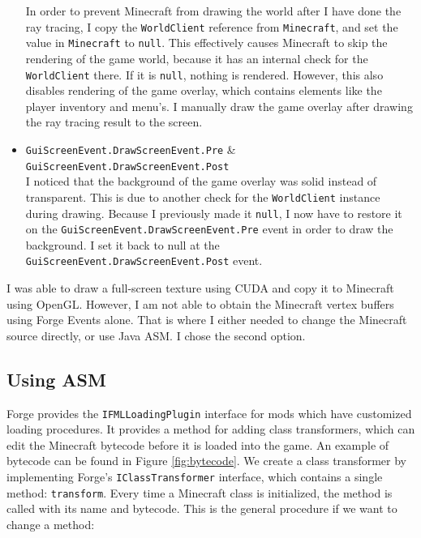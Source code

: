 \documentclass[]{article}
\begin{document}
\begin{itemize}
    In order to prevent Minecraft from drawing the world after I have done the ray tracing, I copy the \texttt{WorldClient} reference from \texttt{Minecraft}, and set the value in \texttt{Minecraft} to \texttt{null}.
    This effectively causes Minecraft to skip the rendering of the game world, because it has an internal check for the \texttt{WorldClient} there.
    If it is \texttt{null}, nothing is rendered.
    However, this also disables rendering of the game overlay, which contains elements like the player inventory and menu's.
    I manually draw the game overlay after drawing the ray tracing result to the screen.
  \item \texttt{GuiScreenEvent.DrawScreenEvent.Pre} \& \texttt{GuiScreenEvent.DrawScreenEvent.Post} \\
    I noticed that the background of the game overlay was solid instead of transparent.
    This is due to another check for the \texttt{WorldClient} instance during drawing.
    Because I previously made it \texttt{null}, I now have to restore it on the \texttt{GuiScreenEvent.DrawScreenEvent.Pre} event in order to draw the background.
    I set it back to null at the \texttt{GuiScreenEvent.DrawScreenEvent.Post} event.
\end{itemize}
I was able to draw a full-screen texture using CUDA and copy it to Minecraft using OpenGL.
However, I am not able to obtain the Minecraft vertex buffers using Forge Events alone.
That is where I either needed to change the Minecraft source directly, or use Java ASM.
I chose the second option.

\subsection{Using ASM}
Forge provides the \texttt{IFMLLoadingPlugin} interface for mods which have customized loading procedures.
It provides a method for adding class transformers, which can edit the Minecraft bytecode before it is loaded into the game.
An example of bytecode can be found in Figure \ref{fig:bytecode}.
We create a class transformer by implementing Forge's \texttt{IClassTransformer} interface, which contains a single method: \texttt{transform}.
Every time a Minecraft class is initialized, the method is called with its name and bytecode.
This is the general procedure if we want to change a method:
\end{document}
